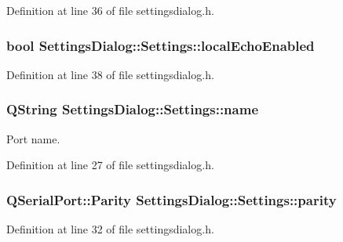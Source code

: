 Definition at line 36 of file settingsdialog.\+h.

\hypertarget{struct_settings_dialog_1_1_settings_ae1bfec3d6530f9791451d12aacfcb014}{}
\subsubsection[{local\+Echo\+Enabled}]{\setlength{\rightskip}{0pt plus 5cm}bool Settings\+Dialog\+::\+Settings\+::local\+Echo\+Enabled}\label{struct_settings_dialog_1_1_settings_ae1bfec3d6530f9791451d12aacfcb014}


Definition at line 38 of file settingsdialog.\+h.

\hypertarget{struct_settings_dialog_1_1_settings_a973c8cfb942a512f34fc4227c0caa6dd}{}
\subsubsection[{name}]{\setlength{\rightskip}{0pt plus 5cm}Q\+String Settings\+Dialog\+::\+Settings\+::name}\label{struct_settings_dialog_1_1_settings_a973c8cfb942a512f34fc4227c0caa6dd}


Port name. 



Definition at line 27 of file settingsdialog.\+h.

\hypertarget{struct_settings_dialog_1_1_settings_ae08a00aa2e45218dade9046e3624cce7}{}
\subsubsection[{parity}]{\setlength{\rightskip}{0pt plus 5cm}Q\+Serial\+Port\+::\+Parity Settings\+Dialog\+::\+Settings\+::parity}\label{struct_settings_dialog_1_1_settings_ae08a00aa2e45218dade9046e3624cce7}


Definition at line 32 of file settingsdialog.\+h.

\hypertarget{struct_settings_dialog_1_1_settings_ab88ff384f7c1127bcbe2dd97b49696a4}{}

